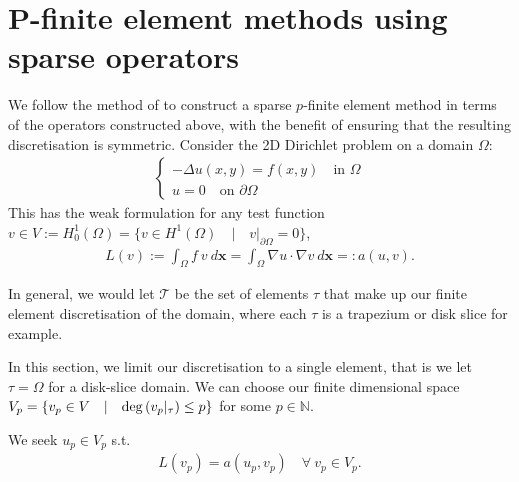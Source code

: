 \documentclass[11pt, oneside]{article}   	%
\newcommand{\N}{\mathbb{N}}
\newcommand{\element}{\tau}
\newcommand{\FEset}{\mathcal{T}}
\begin{document}



\appendix
%
\section{P-finite element methods using sparse operators}\label{Appendix:PFEM}

We follow the method of \cite{beuchler2006new} to construct a sparse $p$-finite element method in terms of the operators constructed above, with the benefit of ensuring that the resulting discretisation is symmetric. Consider the 2D Dirichlet problem on a domain $\Omega$:
\begin{align*}
	\begin{cases}
         - \Delta u(x,y) = f(x,y) \quad \text{in } \Omega \\
         u = 0 \quad \text{on } \partial \Omega
         \end{cases}
\end{align*}
This has the weak formulation for any test function $v \in V := H_0^1(\Omega) = \{v \in H^1(\Omega) \quad | \quad v|_{\partial \Omega} = 0 \}$,
\begin{align*}
	L(v) := \int_\Omega f \: v \: d\mathbf{x} = \int_\Omega \nabla u \cdot \nabla v \: d\mathbf{x} =: a(u,v).
\end{align*}

In general, we would let $\FEset$ be the set of elements $\element$ that make up our finite element discretisation of the domain, where each $\element$ is a trapezium or disk slice for example. 

In this section, we limit our discretisation to a single element, that is we let $\element = \Omega$ for a disk-slice domain. We can choose our finite dimensional space $V_p = \{v_p \in V \quad | \quad {\rm deg}\,(v_p|_\element) \le p\}$ for some $p \in \N$.

We seek $u_p \in V_p$ s.t.
\begin{align}
	L(v_p) = a(u_p,v_p) \quad \forall \: v_p \in V_p.
	\label{eqn:FEMweakform}
\end{align}
\end{document}
